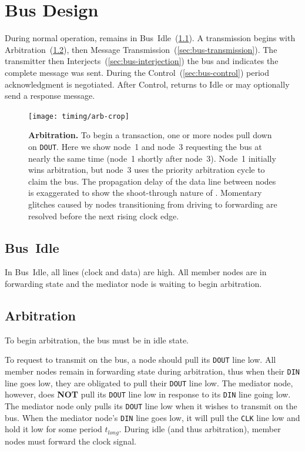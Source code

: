 \section{Bus Design}
\label{sec:bus}
During normal operation, \bus remains in Bus~Idle~(\ref{sec:bus-idle}).
A transmission begins with Arbitration~(\ref{sec:bus-arbitration}), then
Message Transmission~(\ref{sec:bus-transmission}). The transmitter then
Interjects~(\ref{sec:bus-interjection}) the bus and indicates the complete
message was sent. During the Control~(\ref{sec:bus-control}) period
acknowledgment is negotiated. After Control, \bus returns to Idle or may
optionally send a response message.

\begin{figure}[h!]
  \centering
  \texttt{[image: timing/arb-crop]}
  \caption{\textbf{\bus Arbitration.} \textmd{
    To begin a transaction, one or more nodes pull down on {\tt DOUT}.
    Here we show node~1 and node~3 requesting the bus at nearly the same time
    (node~1 shortly after node~3). Node~1 initially wins arbitration, but
    node~3 uses the priority arbitration cycle to claim the bus. The
    propagation delay of the data line between nodes is exaggerated to show
    the shoot-through nature of \bus. Momentary glitches caused by nodes
    transitioning from driving to forwarding are resolved before the next
    rising clock edge.
  }}
  \label{fig:arbitration}
\end{figure}

\subsection{Bus~Idle}
\label{sec:bus-idle}
In \bus Bus~Idle, all lines (clock and data) are high. All member nodes are in
forwarding state and the mediator node is waiting to begin arbitration.

\subsection{Arbitration}
\label{sec:bus-arbitration}
To begin arbitration, the bus must be in idle state.

To request to transmit on the bus, a node should pull its {\tt DOUT} line low.
All member nodes remain in forwarding state during arbitration, thus when
their {\tt DIN} line goes low, they are obligated to pull their {\tt DOUT}
line low. The mediator node, however, does {\bf NOT} pull its {\tt DOUT} line
low in response to its {\tt DIN} line going low. The mediator node only pulls
its {\tt DOUT} line low when it wishes to transmit on the bus. When the
mediator node's {\tt DIN} line goes low, it will pull the {\tt CLK} line low
and hold it low for some period $t_{long}$. During {\sc idle} (and thus
arbitration), member nodes must forward the clock signal.


